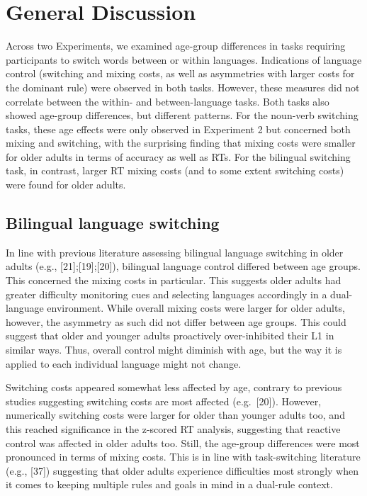 \documentclass[
]{article}
\begin{document}
\hypertarget{general-discussion}{%
\section{General Discussion}\label{general-discussion}}

Across two Experiments, we examined age-group differences in tasks requiring participants to switch words between or within languages. Indications of language control (switching and mixing costs, as well as asymmetries with larger costs for the dominant rule) were observed in both tasks. However, these measures did not correlate between the within- and between-language tasks. Both tasks also showed age-group differences, but different patterns. For the noun-verb switching tasks, these age effects were only observed in Experiment 2 but concerned both mixing and switching, with the surprising finding that mixing costs were smaller for older adults in terms of accuracy as well as RTs. For the bilingual switching task, in contrast, larger RT mixing costs (and to some extent switching costs) were found for older adults.

\hypertarget{bilingual-language-switching}{%
\subsection{Bilingual language switching}\label{bilingual-language-switching}}

In line with previous literature assessing bilingual language switching in older adults (e.g., {[}21{]};{[}19{]};{[}20{]}), bilingual language control differed between age groups. This concerned the mixing costs in particular. This suggests older adults had greater difficulty monitoring cues and selecting languages accordingly in a dual-language environment. While overall mixing costs were larger for older adults, however, the asymmetry as such did not differ between age groups. This could suggest that older and younger adults proactively over-inhibited their L1 in similar ways. Thus, overall control might diminish with age, but the way it is applied to each individual language might not change.

Switching costs appeared somewhat less affected by age, contrary to previous studies suggesting switching costs are most affected (e.g.~{[}20{]}). However, numerically switching costs were larger for older than younger adults too, and this reached significance in the z-scored RT analysis, suggesting that reactive control was affected in older adults too. Still, the age-group differences were most pronounced in terms of mixing costs. This is in line with task-switching literature (e.g., {[}37{]}) suggesting that older adults experience difficulties most strongly when it comes to keeping multiple rules and goals in mind in a dual-rule context.
\end{document}
